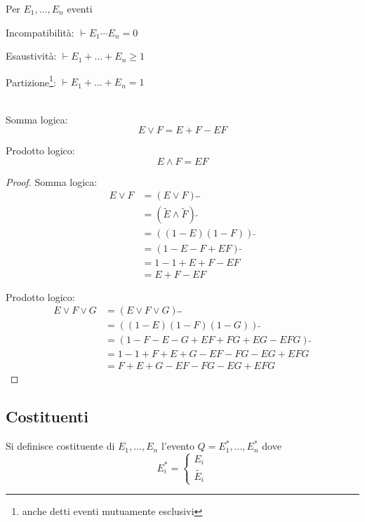 \begin{definition}
  Per \( E_1, \ldots, E_n \) eventi

  Incompatibilità: \( \vdash E_1  \cdots E_n = 0 \)

  Esaustività: \( \vdash E_1 + \ldots + E_n \geq 1 \)

  Partizione\footnote{anche detti eventi mutuamente esclusivi}: \( \vdash E_1 + \ldots + E_n = 1 \)
\end{definition}

\begin{proposition}{\ \\}
  Somma logica:
  \[ E \vee F = E + F - EF \]

  Prodotto logico:
  \[ E \wedge F = EF \]
\end{proposition}
\begin{proof}
  Somma logica:
  \begin{equation*}
    \begin{split}
      E \vee F &= (E \vee F) ~ \tilde{} ~ \tilde{} \\
      &= (\tilde{E} \wedge \tilde{F}) ~ \tilde{} \\
      &= ((1-E)(1-F)) ~ \tilde{} \\
      &= (1 - E - F + EF) ~ \tilde{} \\
      &= 1 - 1 + E + F - EF \\
      &= E + F - EF
    \end{split}
  \end{equation*}

  Prodotto logico:
  \begin{equation*}
    \begin{split}
      E \vee F \vee G &= (E \vee F \vee G) ~ \tilde{} ~ \tilde{} \\
      &= ((1 - E)(1 - F)(1 - G)) ~ \tilde{} \\
      &= (1 - F - E - G + EF + FG + EG - EFG) ~ \tilde{} \\
      &= 1 - 1 + F + E + G - EF - FG - EG + EFG \\
      &= F + E + G - EF - FG - EG + EFG
    \end{split}
  \end{equation*}
\end{proof}

\subsection{Costituenti}
\begin{definition}[Costituente]
  Si definisce costituente di \( E_1, \ldots, E_n \) l'evento \( Q = E_1^*, \ldots, E_n^* \) dove
  \begin{equation*}
    E_i^* =
    \begin{cases}
      E_i \\
      \tilde{E_i}
    \end{cases}
  \end{equation*}
\end{definition}

